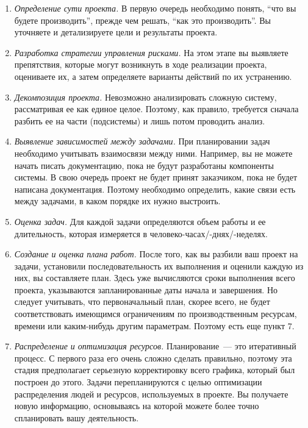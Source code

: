 \documentclass{../../text-style}
\begin{document}
\begin{enumerate}
    \item \emph{Определение сути проекта.} В первую очередь необходимо понять, \enquote{что вы будете производить}, прежде чем решать, \enquote{как это производить}. Вы уточняете и детализируете цели и результаты проекта.
    \item \emph{Разработка стратегии управления рисками.} На этом этапе вы выявляете препятствия, которые могут возникнуть в ходе реализации проекта, оцениваете их, а затем определяете варианты действий по их устранению.
    \item \emph{Декомпозиция проекта.} Невозможно анализировать сложную систему, рассматривая ее как единое целое. Поэтому, как правило, требуется сначала разбить ее на части (подсистемы) и лишь потом проводить анализ.
    \item \emph{Выявление зависимостей между задачами.} При планировании задач необходимо учитывать взаимосвязи между ними. Например, вы не можете начать писать документацию, пока не будут разработаны компоненты системы. В свою очередь проект не будет принят заказчиком, пока не будет написана документация. Поэтому необходимо определить, какие связи есть между задачами, в каком порядке их нужно выстроить.
    \item \emph{Оценка задач.} Для каждой задачи определяются объем работы и ее длительность, которая измеряется в человеко-часах/-днях/-неделях.
    \item \emph{Создание и оценка плана работ.} После того, как вы разбили ваш проект на задачи, установили последовательность их выполнения и оценили каждую из них, вы составляете план. Здесь уже вычисляются сроки выполнения всего проекта, указываются запланированные даты начала и завершения. Но следует учитывать, что первоначальный план, скорее всего, не будет соответствовать имеющимся ограничениям по производственным ресурсам, времени или каким-нибудь другим параметрам. Поэтому есть еще пункт 7.
    \item \emph{Распределение и оптимизация ресурсов.} Планирование~--- это итеративный процесс. С первого раза его очень сложно сделать правильно, поэтому эта стадия предполагает серьезную корректировку всего графика, который был построен до этого. Задачи перепланируются с целью оптимизации распределения людей и ресурсов, используемых в проекте. Вы получаете новую информацию, основываясь на которой можете более точно спланировать вашу деятельность.
\end{enumerate}
\end{document}
